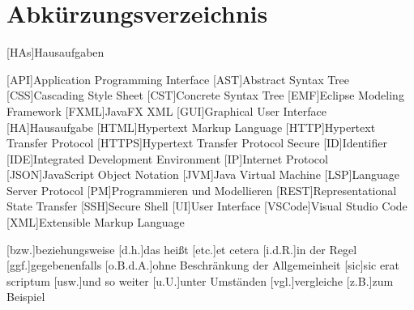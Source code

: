 \chapter*{Abkürzungsverzeichnis}


[HAs]{Hausaufgaben}

\begin{acronym}[XXXXXX]
    [API]{Application Programming Interface}
    [AST]{Abstract Syntax Tree}
    [CSS]{Cascading Style Sheet}
    [CST]{Concrete Syntax Tree}
    [EMF]{Eclipse Modeling Framework}
    [FXML]{JavaFX XML}
    [GUI]{Graphical User Interface}
    [HA]{Hausaufgabe}
    [HTML]{Hypertext Markup Language}
    [HTTP]{Hypertext Transfer Protocol}
    [HTTPS]{Hypertext Transfer Protocol Secure}
    [ID]{Identifier}
    [IDE]{Integrated Development Environment}
    [IP]{Internet Protocol}
    [JSON]{JavaScript Object Notation}
    [JVM]{Java Virtual Machine}
    [LSP]{Language Server Protocol}
    [PM]{Programmieren und Modellieren}
    [REST]{Representational State Transfer}
    [SSH]{Secure Shell}
    [UI]{User Interface}
    [VSCode]{Visual Studio Code}
    [XML]{Extensible Markup Language}

    \vspace{\parskip}

    [bzw.]{beziehungsweise}
    [d.h.]{das heißt}
    [etc.]{et cetera}
    [i.d.R.]{in der Regel}
    [ggf.]{gegebenenfalls}
    [o.B.d.A.]{ohne Beschränkung der Allgemeinheit}
    [sic]{sic erat scriptum}
    [usw.]{und so weiter}
    [u.U.]{unter Umständen}
    [vgl.]{vergleiche}
    [z.B.]{zum Beispiel}
\end{acronym}
